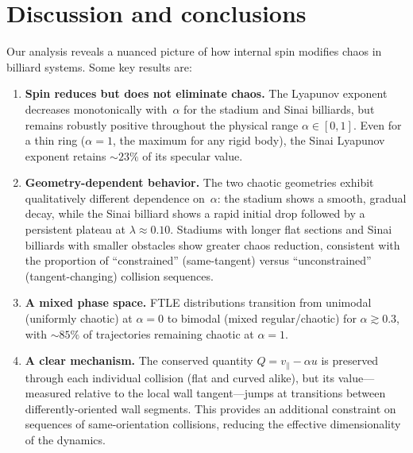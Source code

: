 \documentclass[aps,prd,twocolumn,superscriptaddress,nofootinbib,floatfix]{revtex4-2}
\begin{document}
\section{Discussion and conclusions}
\label{sec:conclusions}
\noindent
Our analysis reveals a nuanced picture of how internal spin modifies chaos in billiard systems. Some key results are:

\begin{enumerate}
    \item \textbf{Spin reduces but does not eliminate chaos.} The Lyapunov exponent decreases monotonically with~$\alpha$ for the stadium and Sinai billiards, but remains robustly positive throughout the physical range $\alpha \in [0, 1]$. Even for a thin ring ($\alpha=1$, the maximum for any rigid body), the Sinai Lyapunov exponent retains $\sim\!23\%$ of its specular value.

    \item \textbf{Geometry-dependent behavior.} The two chaotic geometries exhibit qualitatively different dependence on~$\alpha$: the stadium shows a smooth, gradual decay, while the Sinai billiard shows a rapid initial drop followed by a persistent plateau at $\lambda \approx 0.10$. Stadiums with longer flat sections and Sinai billiards with smaller obstacles show greater chaos reduction, consistent with the proportion of ``constrained'' (same-tangent) versus ``unconstrained'' (tangent-changing) collision sequences.

    \item \textbf{A mixed phase space.} FTLE distributions transition from unimodal (uniformly chaotic) at $\alpha=0$ to bimodal (mixed regular/chaotic) for $\alpha\gtrsim 0.3$, with $\sim\!85\%$ of trajectories remaining chaotic at $\alpha=1$.

    \item \textbf{A clear mechanism.} The conserved quantity $Q=v_\parallel - \alpha u$ is preserved through each individual collision (flat and curved alike), but its value---measured relative to the local wall tangent---jumps at transitions between differently-oriented wall segments. This provides an additional constraint on sequences of same-orientation collisions, reducing the effective dimensionality of the dynamics.
\end{enumerate}
\noindent
\end{document}
